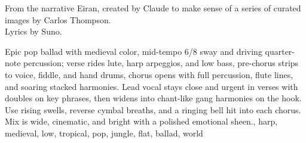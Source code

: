 
\begin{notes}
From the narrative Eiran, created by Claude to make sense of a series of curated images by Carlos Thompson.\\
Lyrics by Suno.
\end{notes}
\begin{style}
Epic pop ballad with medieval color, mid-tempo 6/8 sway and driving quarter-note percussion; verse rides lute, harp arpeggios, and low bass, pre-chorus strips to voice, fiddle, and hand drums, chorus opens with full percussion, flute lines, and soaring stacked harmonies. %
Lead vocal stays close and urgent in verses with doubles on key phrases, then widens into chant-like gang harmonies on the hook. %
Use rising swells, reverse cymbal breaths, and a ringing bell hit into each chorus. %
Mix is wide, cinematic, and bright with a polished emotional sheen., harp, medieval, low, tropical, pop, jungle, flat, ballad, world
\end{style}
